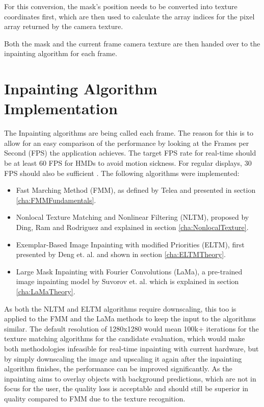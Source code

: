 For this conversion, the mask's position needs to be converted into texture coordinates first, which are then used to calculate the array indices for the pixel array returned by the camera texture.

Both the mask and the current frame camera texture are then handed over to the inpainting algorithm for each frame.

\section{Inpainting Algorithm Implementation}

The Inpainting algorithms are being called each frame. The reason for this is to allow for an easy comparison of the performance by looking at the Frames per Second (FPS) the application achieves. The target FPS rate for real-time should be at least 60 FPS for HMDs to avoid motion sickness. For regular displays, 30 FPS should also be sufficient \cite{WangQile2023Asro}. 
The following algorithms were implemented:

\begin{itemize}
    \item Fast Marching Method (FMM), as defined by Telea \cite{TeleaFastMarching2004} and presented in section \ref{cha:FMMFundamentals}.

    \item Nonlocal Texture Matching and Nonlinear Filtering (NLTM), proposed by Ding, Ram and Rodriguez \cite{DingRam2019} and explained in section \ref{cha:NonlocalTexture}.
    
    \item Exemplar-Based Image Inpainting with modified Priorities (ELTM), first presented by Deng et. al. \cite{DengLiang-Jian2015EIIU} and shown in section \ref{cha:ELTMTheory}.
    
    \item Large Mask Inpainting with Fourier Convolutions (LaMa), a pre-trained image inpainting model by Suvorov et. al. \cite{SuvorovRoman2022RLMI} which is explained in section \ref{cha:LaMaTheory}.
    
\end{itemize}

As both the NLTM and ELTM algorithms require downscaling, this too is applied to the FMM and the LaMa methods to keep the input to the algorithms similar. The default resolution of 1280x1280 would mean 100k+ iterations for the texture matching algorithms for the candidate evaluation, which would make both methodologies infeasible for real-time inpainting with current hardware, but by simply downscaling the image and upscaling it again after the inpainting algorithm finishes,
the performance can be improved significantly. As the inpainting aims to overlay objects with background predictions, which are not in focus for the user, the quality loss is acceptable and should still be superior in quality compared to FMM due to the texture recognition.

